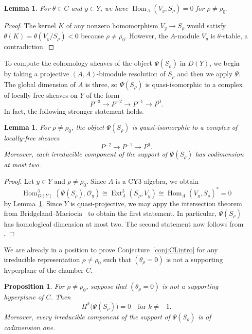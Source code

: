 \documentclass[11pt,reqno]{amsart}
\numberwithin{equation}{section}
\newtheorem{lemma}[theorem]{Lemma}
\newtheorem{proposition}[theorem]{Proposition}
\theoremstyle{definition}
\newcommand{\Ext}{\operatorname{Ext}}
\newcommand{\Hom}{\operatorname{Hom}}
\newcommand{\0}{\operatorname{0}}
\begin{document}
 \begin{lemma}
 \label{lem:HomVySrho}
 For $\theta\in C$ and $y\in Y$, we have $\Hom_A(V_y,S_\rho)=0$ for $\rho\neq \rho_0$.
 \end{lemma}
 \begin{proof}
 The kernel $K$ of any nonzero homomorphism $V_y\to S_\rho$ would satisfy $\theta(K)=\theta(V_y/S_\rho)<0$ because $\rho\neq\rho_0$. However, the $A$-module $V_y$ is $\theta$-stable, a contradiction.
   \end{proof}
 
 To compute the cohomology sheaves of the object $\Psi(S_\rho)$ in $D(Y)$,  we begin by taking a projective $(A,A)$-bimodule resolution of $S_\rho$ and then we apply $\Psi$. The global dimension of $A$ is three, so $\Psi(S_\rho)$ is quasi-isomorphic to a complex of locally-free sheaves on $Y$ of the form
 \[
 P^{-3}\longrightarrow P^{-2}\longrightarrow P^{-1}\longrightarrow P^0.
 \]
 In fact, the following stronger statement holds.
 
 \begin{lemma}
 \label{lem:Hom3}
 For $\rho\neq \rho_0$, the object $\Psi(S_\rho)$ is quasi-isomorphic to a complex of locally-free sheaves 
 \[
 P^{-2}\longrightarrow P^{-1}\longrightarrow P^0.
 \]
 Moreover, each irreducible component of the support of $\Psi(S_\rho)$ has codimension at most two.
  \end{lemma}
  \begin{proof}
  Let $y\in Y$ and $\rho\neq \rho_0$. Since $A$ is a CY3 algebra, we obtain
 \begin{equation}
 \label{eqn:Hom3}
 \Hom_{D(Y)}^3(\Psi(S_\rho), \mathcal{O}_y) \cong \Ext^3_A(S_\rho, V_y) \cong \Hom_A(V_y,S_\rho)^* = 0
 \end{equation}
 by Lemma~\ref{lem:HomVySrho}. Since $Y$ is quasi-projective, we may appy the intersection theorem from Bridgeland--Maciocia~\cite[Proposition~5.4]{BM02} to obtain the first statement. In particular, $\Psi(S_\rho)$ has homological dimension at most two. The second statement now follows from \cite[Corollary~5.5]{BM02}.
 \end{proof}
 
 We are already in a position to prove Conjecture~\ref{conj:CLintro} for any irreducible representation $\rho\neq \rho_0$ such that $(\theta_\rho=0)$ is not a supporting hyperplane of the chamber $C$. 
   
 \begin{proposition}
 \label{prop:type1}
 For $\rho\neq \rho_0$, suppose that $(\theta_\rho=0)$ is not a supporting hyperplane of $C$. Then 
 \[
 H^k\big(\Psi(S_\rho)\big)=0 \quad\text{for }k\neq -1.
 \]
 Moreover, every irreducible component of the support of $\Psi(S_\rho)$ is of codimension one.
 \end{proposition}
 
\end{document}
